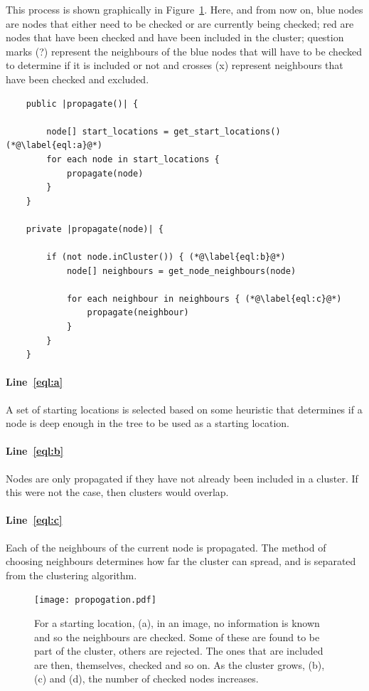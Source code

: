 This process is shown graphically in Figure~\ref{fig:propogation}. Here, and
from now on, blue nodes are nodes that either need to be checked or are
currently being checked; red are nodes that have been checked and have been
included in the cluster; question marks ({\footnotesize?}) represent the
neighbours of the blue nodes that will have to be checked to determine if it is
included or not and crosses ({\footnotesize x}) represent neighbours that have
been checked and excluded.

\begin{lstlisting}
	public |propagate()| {

		node[] start_locations = get_start_locations() (*@\label{eql:a}@*)
		for each node in start_locations {
			propagate(node)
		}
	}

	private |propagate(node)| {

		if (not node.inCluster()) { (*@\label{eql:b}@*)
			node[] neighbours = get_node_neighbours(node)

			for each neighbour in neighbours { (*@\label{eql:c}@*)
				propagate(neighbour)
			}
		}
	}
\end{lstlisting}

\paragraph{Line~\ref{eql:a}} A set of starting locations is selected based on
some heuristic that determines if a node is deep enough in the tree to be used
as a starting location.

\paragraph{Line~\ref{eql:b}} Nodes are only propagated if they have not already
been included in a cluster. If this were not the case, then clusters would
overlap.

\paragraph{Line~\ref{eql:c}} Each of the neighbours of the current node is
propagated. The method of choosing neighbours determines how far the cluster
can spread, and is separated from the clustering algorithm.

\begin{figure}[tbhp]
	\centering
	\texttt{[image: propogation.pdf]}

	\caption[Propagation of a cluster from a starting location.]{For a starting
		location, (a), in an image, no information is known and so the
		neighbours are checked. Some of these are found to be part of the
		cluster, others are rejected. The ones that are included are then,
		themselves, checked and so on. As the cluster grows, (b), (c) and
		(d), the number of checked nodes increases.}\label{fig:propogation}
\end{figure}

